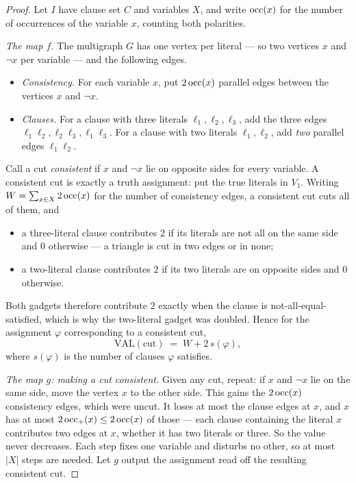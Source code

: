 \begin{proof}
Let $I$ have clause set $C$ and variables $X$, and write $\operatorname{occ}(x)$ for the
number of occurrences of the variable $x$, counting both polarities.

\emph{The map $f$.} The multigraph $G$ has one vertex per literal --- so two
vertices $x$ and $\neg x$ per variable --- and the following edges.
\begin{itemize}[leftmargin=*,nosep]
  \item \emph{Consistency.} For each variable $x$, put $2\operatorname{occ}(x)$ parallel
        edges between the vertices $x$ and $\neg x$.
  \item \emph{Clauses.} For a clause with three literals
        $\ell_1, \ell_2, \ell_3$, add the three edges
        $\ell_1\ell_2, \ell_2\ell_3, \ell_1\ell_3$. For a clause with two
        literals $\ell_1, \ell_2$, add \emph{two} parallel edges
        $\ell_1\ell_2$.
\end{itemize}

Call a cut \emph{consistent} if $x$ and $\neg x$ lie on opposite sides for
every variable. A consistent cut is exactly a truth assignment: put the true
literals in $V_1$. Writing $W = \sum_{x \in X} 2\operatorname{occ}(x)$ for the number of
consistency edges, a consistent cut cuts all of them, and

\begin{itemize}[leftmargin=*,nosep]
  \item a three-literal clause contributes $2$ if its literals are not all on
        the same side and $0$ otherwise --- a triangle is cut in two edges or
        in none;
  \item a two-literal clause contributes $2$ if its two literals are on
        opposite sides and $0$ otherwise.
\end{itemize}
Both gadgets therefore contribute $2$ exactly when the clause is
not-all-equal-satisfied, which is why the two-literal gadget was doubled. Hence
for the assignment $\varphi$ corresponding to a consistent cut,
\begin{equation}\label{eq:maxcut-value}
  \mathrm{VAL}(\text{cut}) \;=\; W + 2\,s(\varphi),
\end{equation}
where $s(\varphi)$ is the number of clauses $\varphi$ satisfies.

\emph{The map $g$: making a cut consistent.} Given any cut, repeat: if $x$ and
$\neg x$ lie on the same side, move the vertex $x$ to the other side. This gains
the $2\operatorname{occ}(x)$ consistency edges, which were uncut. It loses at most the clause
edges at $x$, and $x$ has at most $2\operatorname{occ}_{+}(x) \le 2\operatorname{occ}(x)$ of those --- each
clause containing the literal $x$ contributes two edges at $x$, whether it has
two literals or three. So the value never decreases. Each step fixes one
variable and disturbs no other, so at most $|X|$ steps are needed. Let $g$
output the assignment read off the resulting consistent cut.


\end{proof}
